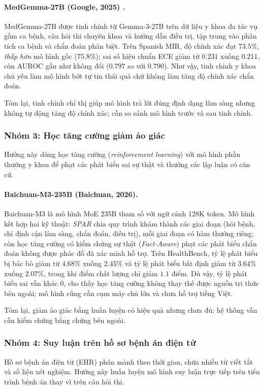 \paragraph{MedGemma-27B (Google, 2025) \cite{spanish_mir_2026}.}
MedGemma-27B được tinh chỉnh từ Gemma-3-27B trên dữ liệu y khoa đa tác vụ gồm ca bệnh, câu hỏi thi chuyên khoa và hướng dẫn điều trị, tập trung vào phân tích ca bệnh và chẩn đoán phân biệt. Trên Spanish MIR, độ chính xác đạt $73.5\%$, \emph{thấp hơn} mô hình gốc ($75.8\%$); sai số hiệu chuẩn ECE giảm từ $0.231$ xuống $0.211$, còn AUROC gần như không đổi ($0.797$ so với $0.790$). Như vậy, tinh chỉnh y khoa chủ yếu làm mô hình bớt tự tin thái quá chứ không làm tăng độ chính xác chẩn đoán.

Tóm lại, tinh chỉnh chỉ thị giúp mô hình trả lời đúng định dạng lâm sàng nhưng không tự động tăng độ chính xác; cần so sánh mô hình trước và sau tinh chỉnh.

\subsubsection{Nhóm 3: Học tăng cường giảm ảo giác}
Hướng này dùng học tăng cường (\emph{reinforcement learning}) với mô hình phần thưởng y khoa để phạt các phát biểu sai sự thật và thưởng các lập luận có căn cứ.

\paragraph{Baichuan-M3-235B (Baichuan, 2026).}
Baichuan-M3 là mô hình MoE 235B tham số với ngữ cảnh 128K token. Mô hình kết hợp hai kỹ thuật: \emph{SPAR} chia quy trình khám thành các giai đoạn (hỏi bệnh, chỉ định cận lâm sàng, chẩn đoán, điều trị), mỗi giai đoạn có hàm thưởng riêng; còn học tăng cường có kiểm chứng sự thật (\emph{Fact-Aware}) phạt các phát biểu chẩn đoán không được phác đồ đã xác minh hỗ trợ. Trên HealthBench, tỷ lệ phát biểu bị bác bỏ giảm từ $4.68\%$ xuống $2.45\%$ và tỷ lệ phát biểu bất định giảm từ $3.64\%$ xuống $2.07\%$, trong khi điểm chất lượng chỉ giảm $1.1$ điểm. Dù vậy, tỷ lệ phát biểu sai vẫn khác 0, cho thấy học tăng cường không thay thế được nguồn tri thức bên ngoài; mô hình cũng cần cụm máy chủ lớn và chưa hỗ trợ tiếng Việt.

Tóm lại, giảm ảo giác bằng huấn luyện có hiệu quả nhưng chưa đủ; hệ thống vẫn cần kiểm chứng bằng chứng bên ngoài.

\subsubsection{Nhóm 4: Suy luận trên hồ sơ bệnh án điện tử}
Hồ sơ bệnh án điện tử (EHR) phân mảnh theo thời gian, chứa nhiều từ viết tắt và số liệu xét nghiệm. Hướng này huấn luyện mô hình suy luận trực tiếp trên tiến trình bệnh án thay vì trên câu hỏi thi.

